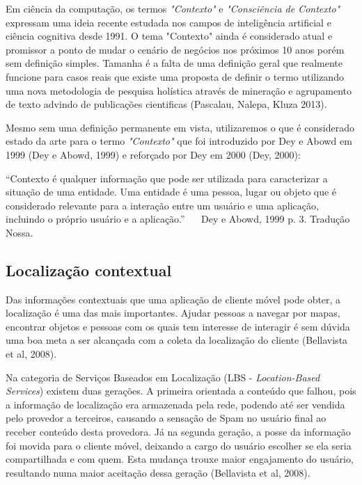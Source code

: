 Em ciência da computação, os termos 
\textit{"Contexto"} e 
\textit{"Consciência de Contexto"} expressam uma ideia recente estudada nos campos de inteligência artificial e ciência cognitiva desde 1991. O tema "Contexto" ainda é considerado atual e promissor a ponto de mudar o cenário de negócios nos próximos 10 anos porém sem definição simples. Tamanha é a falta de uma definição geral que realmente funcione para casos reais que existe uma proposta de definir o termo utilizando uma nova metodologia de pesquisa holística através de mineração e agrupamento de texto advindo de publicações cientificas 
\cite{Pascalau2013}
(Pascalau, Nalepa, Kluza 2013).


Mesmo sem uma definição permanente em vista, utilizaremos o que é considerado estado da arte para o termo 
\textit{"Contexto"} 
que foi introduzido por Dey e Abowd em 1999 
\cite{Dey1999}
(Dey e Abowd, 1999)
 e reforçado por Dey em 2000 
 \cite{Dey2000}
 (Dey, 2000):

\begin{citacao}
	``Contexto é qualquer informação que pode ser utilizada para caracterizar a situação de uma entidade. Uma entidade é uma pessoa, lugar ou objeto que é considerado relevante para a interação entre um usuário e uma aplicação, incluindo o próprio usuário e a aplicação.'' \
	 \
	Dey e Abowd, 1999 p. 3. Tradução Nossa.
\end{citacao}

\subsection{Localização contextual}
\label{subsec:Localização contextual}

Das informações contextuais que uma aplicação de cliente móvel pode obter, a localização é uma das mais importantes. Ajudar pessoas a navegar por mapas, encontrar objetos e pessoas com os quais tem interesse de interagir é sem dúvida uma boa meta a ser alcançada com a coleta da localização do cliente \cite{Bellavista2008} (Bellavista et al, 2008).

Na categoria de Serviços Baseados em Localização (LBS - \textit{Location-Based Services}) existem duas gerações. A primeira orientada a conteúdo que falhou, pois a informação de localização era armazenada pela rede, podendo até ser vendida pelo provedor a terceiros, causando a sensação de Spam no usuário final ao receber conteúdo desta provedora. Já na segunda geração, a posse da informação foi movida para o cliente móvel, deixando a cargo do usuário escolher se ela seria compartilhada e com quem. Esta mudança trouxe maior engajamento do usuário, resultando numa maior aceitação dessa geração \cite{Bellavista2008}  (Bellavista et al, 2008).


